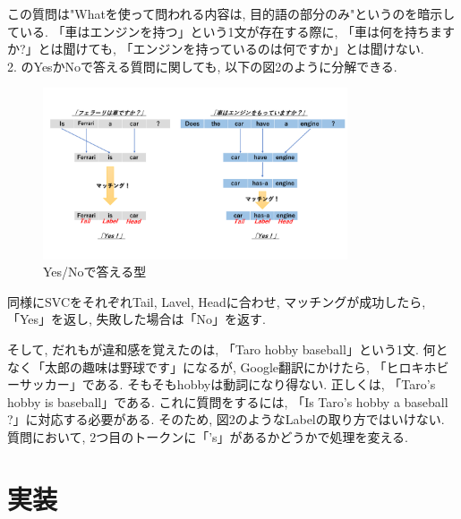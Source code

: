 \documentclass[uplatex,12pt]{jsarticle}
\begin{document}
この質問は"Whatを使って問われる内容は, 目的語の部分のみ"というのを暗示している. 「車はエンジンを持つ」という1文が存在する際に, 「車は何を持ちますか?」とは聞けても, 「エンジンを持っているのは何ですか」とは聞けない. \\

2. のYesかNoで答える質問に関しても, 以下の図2のように分解できる.
\begin{figure}[htbp]
 \begin{center}
  \includegraphics[width = 9cm, pagebox = cropbox, clip]{英文構造_YesNo型.pdf}
 \end{center}
 \caption[]{Yes/Noで答える型}\label{fig:fig1.1}
\end{figure}

 同様にSVCをそれぞれTail, Lavel, Headに合わせ, マッチングが成功したら, 「Yes」を返し, 失敗した場合は「No」を返す.

そして, だれもが違和感を覚えたのは, 「Taro hobby baseball」という1文. 何となく「太郎の趣味は野球です」になるが, Google翻訳にかけたら, 「ヒロキホビーサッカー」である. そもそもhobbyは動詞になり得ない. 正しくは, 「Taro's hobby is baseball」である. これに質問をするには, 「Is Taro's hobby a baseball ?」に対応する必要がある. そのため, 図2のようなLabelの取り方ではいけない. 質問において, 2つ目のトークンに「's」があるかどうかで処理を変える.

\section{実装}
\end{document}
